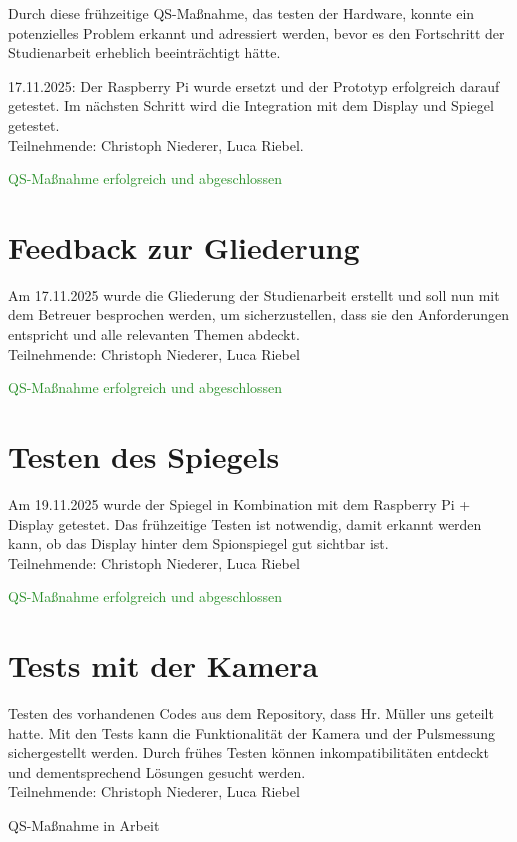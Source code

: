 Durch diese frühzeitige QS-Maßnahme, das testen der Hardware, konnte ein potenzielles Problem erkannt und adressiert werden, bevor es den Fortschritt der Studienarbeit erheblich beeinträchtigt hätte.


17.11.2025: Der Raspberry Pi wurde ersetzt und der Prototyp erfolgreich darauf getestet. Im nächsten Schritt wird die Integration mit dem Display und Spiegel getestet.
\\
Teilnehmende: Christoph Niederer, Luca Riebel.

{\textcolor{ForestGreen}{QS-Maßnahme erfolgreich und abgeschlossen}}

\section{Feedback zur Gliederung}
Am 17.11.2025 wurde die Gliederung der Studienarbeit erstellt und soll nun mit dem Betreuer besprochen werden, um sicherzustellen, dass sie den Anforderungen entspricht und alle relevanten Themen abdeckt.
\\
Teilnehmende: Christoph Niederer, Luca Riebel

{\textcolor{ForestGreen}{QS-Maßnahme erfolgreich und abgeschlossen}}

\section{Testen des Spiegels}
Am 19.11.2025 wurde der Spiegel in Kombination mit dem Raspberry Pi + Display getestet. Das frühzeitige Testen ist notwendig, damit erkannt werden kann, ob das Display hinter dem Spionspiegel gut sichtbar ist.
\\
Teilnehmende: Christoph Niederer, Luca Riebel

{\textcolor{ForestGreen}{QS-Maßnahme erfolgreich und abgeschlossen}}

\section{Tests mit der Kamera}
Testen des vorhandenen Codes aus dem Repository, dass Hr. Müller uns geteilt hatte. Mit den Tests kann die Funktionalität der Kamera und der Pulsmessung sichergestellt werden. Durch frühes Testen können inkompatibilitäten entdeckt und dementsprechend Lösungen gesucht werden.
\\
Teilnehmende: Christoph Niederer, Luca Riebel

{\textcolor{yellow!80!brown}{QS-Maßnahme in Arbeit}}
